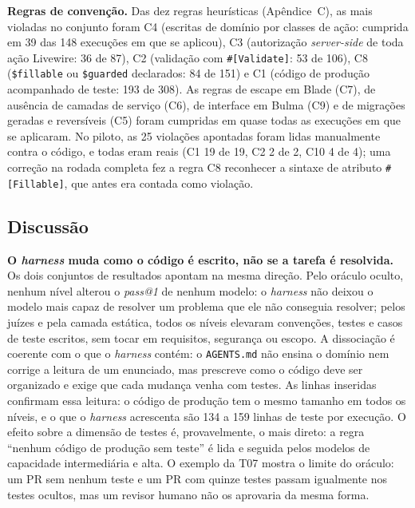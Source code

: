 \textbf{Regras de convenção.} Das dez regras heurísticas (Apêndice~C), as
mais violadas no conjunto foram C4 (escritas de domínio por classes de ação:
cumprida em 39 das 148 execuções em que se aplicou), C3 (autorização
\textit{server-side} de toda ação Livewire: 36 de 87), C2 (validação com
\texttt{\#[Validate]}: 53 de 106), C8 (\texttt{\$fillable} ou \texttt{\$guarded}
declarados: 84 de 151) e C1 (código de produção acompanhado de teste: 193 de
308). As regras de escape em Blade (C7), de ausência de camadas de serviço
(C6), de interface em Bulma (C9) e de migrações geradas e reversíveis (C5)
foram cumpridas em quase todas as execuções em que se aplicaram. No piloto,
as 25 violações apontadas foram lidas manualmente contra o código, e todas
eram reais (C1 19 de 19, C2 2 de 2, C10 4 de 4); uma correção na rodada
completa fez a regra C8 reconhecer a sintaxe de atributo \texttt{\#[Fillable]},
que antes era contada como violação.

\subsection{Discussão}
\label{sec:discussao}

\textbf{O \textit{harness} muda como o código é escrito, não se a tarefa é
resolvida.} Os dois conjuntos de resultados apontam na mesma direção. Pelo
oráculo oculto, nenhum nível alterou o \textit{pass@1} de nenhum modelo: o \textit{harness} não deixou o modelo mais capaz de resolver um problema que ele não conseguia resolver; pelos
juízes e pela camada estática, todos os níveis elevaram convenções, testes e
casos de teste escritos, sem tocar em requisitos, segurança ou escopo. A
dissociação é coerente com o que o \textit{harness} contém: o \texttt{AGENTS.md}
não ensina o domínio nem corrige a leitura de um enunciado, mas prescreve como
o código deve ser organizado e exige que cada mudança venha com testes. As
linhas inseridas confirmam essa leitura: o código de produção tem o mesmo
tamanho em todos os níveis, e o que o \textit{harness} acrescenta são 134 a 159
linhas de teste por execução. O efeito sobre a dimensão de testes é,
provavelmente, o mais direto: a regra
``nenhum código de produção sem teste'' é lida e seguida pelos modelos de
capacidade intermediária e alta. O exemplo da T07 mostra o limite do oráculo:
um PR sem nenhum teste e um PR com quinze testes passam igualmente nos testes
ocultos, mas um revisor humano não os aprovaria da mesma forma.

